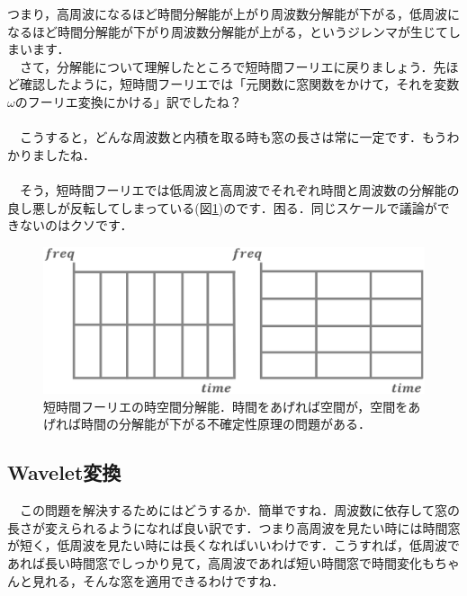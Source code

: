 \documentclass[11pt,a4paper]{ujreport} 	%
\begin{document}
つまり，高周波になるほど時間分解能が上がり周波数分解能が下がる，低周波になるほど時間分解能が下がり周波数分解能が上がる，というジレンマが生じてしまいます．\\

　さて，分解能について理解したところで短時間フーリエに戻りましょう．先ほど確認したように，短時間フーリエでは「元関数に窓関数をかけて，それを変数$\omega$のフーリエ変換にかける」訳でしたね？\\
\\
　こうすると，どんな周波数と内積を取る時も窓の長さは常に一定です．もうわかりましたね．\\
\\
　そう，短時間フーリエでは低周波と高周波でそれぞれ時間と周波数の分解能の良し悪しが反転してしまっている(図\ref{im:furiers})のです．困る．同じスケールで議論ができないのはクソです．

\begin{figure}[H]
\label{im:furiers}
 \centering
 \includegraphics[width=15cm]{../figures/uncertainty.eps}
 \caption{短時間フーリエの時空間分解能．時間をあげれば空間が，空間をあげれば時間の分解能が下がる不確定性原理の問題がある．}
\end{figure}


\subsection{Wavelet変換}
　この問題を解決するためにはどうするか．簡単ですね．周波数に依存して窓の長さが変えられるようになれば良い訳です．つまり高周波を見たい時には時間窓が短く，低周波を見たい時には長くなればいいわけです．こうすれば，低周波であれば長い時間窓でしっかり見て，高周波であれば短い時間窓で時間変化もちゃんと見れる，そんな窓を適用できるわけですね．\\

\end{document}
